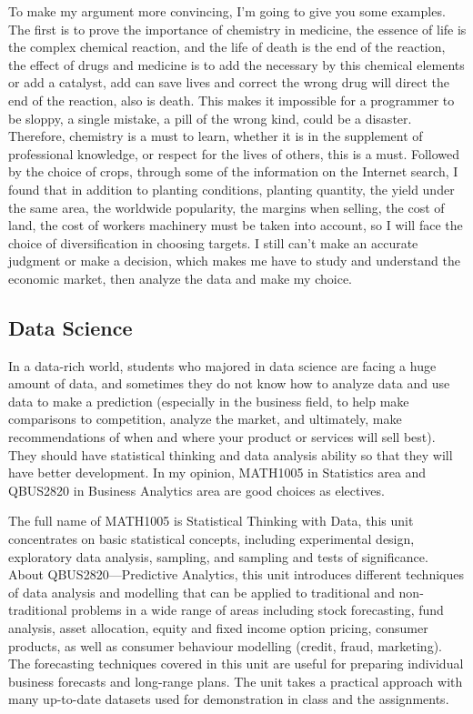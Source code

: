 \documentclass[12pt]{article}
\begin{document}
To make my argument more convincing, I'm going to give you some examples. The first is to prove the importance of chemistry in medicine, the essence of life is the complex chemical reaction, and the life of death is the end of the reaction, the effect of drugs and medicine is to add the necessary by this chemical elements or add a catalyst, add can save lives and correct the wrong drug will direct the end of the reaction, also is death. This makes it impossible for a programmer to be sloppy, a single mistake, a pill of the wrong kind, could be a disaster. Therefore, chemistry is a must to learn, whether it is in the supplement of professional knowledge, or respect for the lives of others, this is a must. Followed by the choice of crops, through some of the information on the Internet search, I found that in addition to planting conditions, planting quantity, the yield under the same area, the worldwide popularity, the margins when selling, the cost of land, the cost of workers machinery must be taken into account, so I will face the choice of diversification in choosing targets. I still can't make an accurate judgment or make a decision, which makes me have to study and understand the economic market, then analyze the data and make my choice.

\newpage
\subsection{Data Science}
In a data-rich world, students who majored in data science are facing a huge amount of data, and sometimes they do not know how to analyze data and use data to make a prediction (especially in the business field, to help make comparisons to competition, analyze the market, and ultimately, make recommendations of when and where your product or services will sell best). They should have statistical thinking and data analysis ability so that they will have better development. In my opinion, MATH1005 in Statistics area and QBUS2820 in Business Analytics area are good choices as electives.

The full name of MATH1005 is Statistical Thinking with Data, this unit concentrates on basic statistical concepts, including experimental design, exploratory data analysis, sampling, and sampling and tests of significance. About QBUS2820—Predictive Analytics, this unit introduces different techniques of data analysis and modelling that can be applied to traditional and non-traditional problems in a wide range of areas including stock forecasting, fund analysis, asset allocation, equity and fixed income option pricing, consumer products, as well as consumer behaviour modelling (credit, fraud, marketing). The forecasting techniques covered in this unit are useful for preparing individual business forecasts and long-range plans. The unit takes a practical approach with many up-to-date datasets used for demonstration in class and the assignments.
\end{document}

